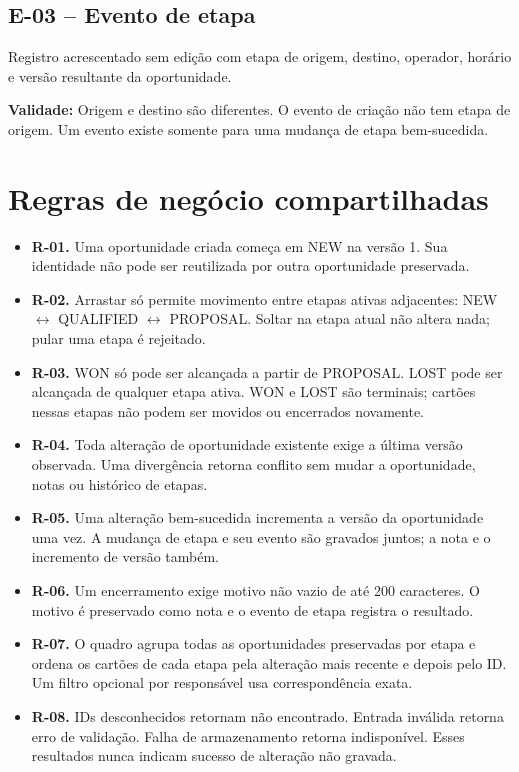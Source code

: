 \documentclass[10pt,a4paper]{article}
\begin{document}
\subsection{E-03 -- Evento de etapa}

Registro acrescentado sem edição com etapa de origem, destino, operador, horário e versão resultante da oportunidade.

\textbf{Validade:} Origem e destino são diferentes. O evento de criação não tem etapa de origem. Um evento existe somente para uma mudança de etapa bem-sucedida.

\section{Regras de negócio compartilhadas}

\begin{itemize}

\item \textbf{R-01.} Uma oportunidade criada começa em NEW na versão 1. Sua identidade não pode ser reutilizada por outra oportunidade preservada.

\item \textbf{R-02.} Arrastar só permite movimento entre etapas ativas adjacentes: NEW \(\leftrightarrow\) QUALIFIED \(\leftrightarrow\) PROPOSAL. Soltar na etapa atual não altera nada; pular uma etapa é rejeitado.

\item \textbf{R-03.} WON só pode ser alcançada a partir de PROPOSAL. LOST pode ser alcançada de qualquer etapa ativa. WON e LOST são terminais; cartões nessas etapas não podem ser movidos ou encerrados novamente.

\item \textbf{R-04.} Toda alteração de oportunidade existente exige a última versão observada. Uma divergência retorna conflito sem mudar a oportunidade, notas ou histórico de etapas.

\item \textbf{R-05.} Uma alteração bem-sucedida incrementa a versão da oportunidade uma vez. A mudança de etapa e seu evento são gravados juntos; a nota e o incremento de versão também.

\item \textbf{R-06.} Um encerramento exige motivo não vazio de até 200 caracteres. O motivo é preservado como nota e o evento de etapa registra o resultado.

\item \textbf{R-07.} O quadro agrupa todas as oportunidades preservadas por etapa e ordena os cartões de cada etapa pela alteração mais recente e depois pelo ID. Um filtro opcional por responsável usa correspondência exata.

\item \textbf{R-08.} IDs desconhecidos retornam não encontrado. Entrada inválida retorna erro de validação. Falha de armazenamento retorna indisponível. Esses resultados nunca indicam sucesso de alteração não gravada.

\end{itemize}
\end{document}
